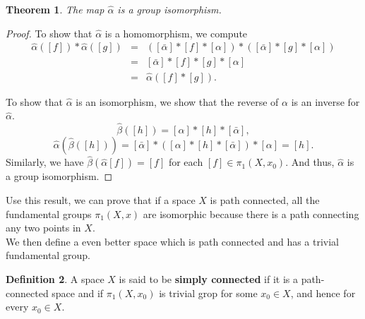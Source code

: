 \documentclass[psamsfonts]{amsart}
\newtheorem{thm}{Theorem}[section]
\theoremstyle{definition}
\newtheorem{defn}[thm]{Definition}
\theoremstyle{remark}
\numberwithin{equation}{section}
\begin{document}
	\begin{thm}
		The map $\hat{\alpha}$ is a group isomorphism.
	\end{thm}
	\begin{proof}
		To show that $\hat{\alpha}$ is a homomorphism, we compute
		\begin{eqnarray}
			\hat{\alpha}([f])*\hat{\alpha}([g])
			&=& ([\bar{\alpha}]*[f]*[\alpha])*([\bar{\alpha}]*[g]*[\alpha])\\
			&=& [\bar{\alpha}]*[f]*[g]*[\alpha]\\
			&=& \hat{\alpha}([f]*[g]).
		\end{eqnarray}
		
		To show that $\hat{\alpha}$ is an isomorphism, we show that the reverse of $\alpha$ is an inverse for $\hat{\alpha}$.
		\begin{equation}
			\hat{\beta}([h]) = [\alpha]*[h]*[\bar{\alpha}],
		\end{equation}
		\begin{equation}
			\hat{\alpha}(\hat{\beta}([h])) = [\bar{\alpha}]*([\alpha]*[h]*[\bar{\alpha}])*[\alpha] = [h].
		\end{equation}
		Similarly, we have $\hat{\beta}(\hat{\alpha}[f]) = [f]$
		for each $[f]\in\pi_1(X,x_0)$. And thus, $\hat{\alpha}$ is a group isomorphism.
	\end{proof}
	
	Use this result, we can prove that if a space $X$ is path connected, all the fundamental groups $\pi_1(X,x)$ are isomorphic because there is a path connecting any two points in $X$.\\
	We then define a even better space which is path connected and has a trivial fundamental group.
	\begin{defn}
		A space $X$ is said to be \textbf{simply connected} if it is a path-connected space and if $\pi_1(X,x_0)$ is trivial grop for some $x_0 \in X$, and hence for every $x_0 \in X$.
	\end{defn}
	
\end{document}
